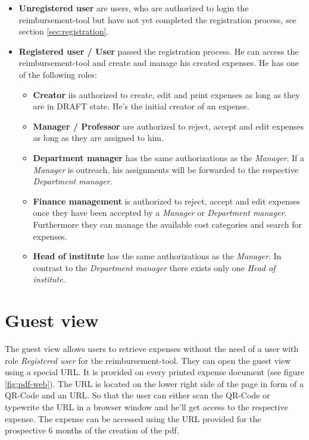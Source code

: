 \begin{itemize}
    \item \textbf{Unregistered user} are users, who are authorized to login the reimbursement-tool but have not yet completed the registration process, see section \ref{sec:registration}.
    \item \textbf{Registered user / User} passed the registration process. He can access the reimbursement-tool and create and manage his created expenses. He has one of the following roles:

    \begin{itemize}
        \item \textbf{Creator} iis authorized to create, edit and print expenses as long as they are in DRAFT state. He's the initial creator of an expense.

        \item \textbf{Manager / Professor} are authorized to reject, accept and edit expenses as long as they are assigned to him.

        \item \textbf{Department manager} has the same authorizations as the \textit{Manager}. If a \textit{Manager} is outreach, his assignments will be forwarded to the respective \textit{Department manager}.

        \item \textbf{Finance management} is authorized to reject, accept and edit expenses once they have been accepted by a \textit{Manager} or \textit{Department manager}. Furthermore they can manage the available cost categories and search for expenses.

        \item \textbf{Head of institute} has the same authorizations as the \textit{Manager}. In contrast to the \textit{Department manager} there exists only one \textit{Head of institute}.
    \end{itemize}
\end{itemize}

\section{Guest view}
The guest view allows users to retrieve expenses without the need of a user with role \textit{Registered user} for the reimbursement-tool. They can open the guest view using a special URL. It is provided on every printed expense document (see figure \ref{fig:pdf-web}). The URL is located on the lower right side of the page in form of a QR-Code and an URL. So that the user can either scan the QR-Code or typewrite the URL in a browser window and he'll get access to the respective expense. \newline
The expense can be accessed using the URL provided for the prospective 6 months of the creation of the pdf.

